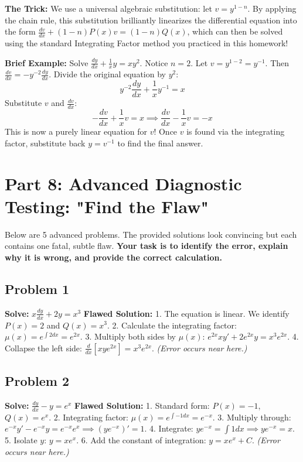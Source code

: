 \documentclass[11pt]{article}
\begin{document}
\textbf{The Trick:} We use a universal algebraic substitution: let $v = y^{1-n}$. By applying the chain rule, this substitution brilliantly linearizes the differential equation into the form $\frac{dv}{dx} + (1-n)P(x)v = (1-n)Q(x)$, which can then be solved using the standard Integrating Factor method you practiced in this homework!

\textbf{Brief Example:}
Solve $\frac{dy}{dx} + \frac{1}{x}y = xy^2$.
Notice $n = 2$.
Let $v = y^{1-2} = y^{-1}$. Then $\frac{dv}{dx} = -y^{-2} \frac{dy}{dx}$.
Divide the original equation by $y^2$:
\[ y^{-2}\frac{dy}{dx} + \frac{1}{x}y^{-1} = x \]
Substitute $v$ and $\frac{dv}{dx}$:
\[ -\frac{dv}{dx} + \frac{1}{x}v = x \implies \frac{dv}{dx} - \frac{1}{x}v = -x \]
This is now a purely linear equation for $v$! Once $v$ is found via the integrating factor, substitute back $y = v^{-1}$ to find the final answer.

\newpage
\section{Part 8: Advanced Diagnostic Testing: "Find the Flaw"}

Below are 5 advanced problems. The provided solutions look convincing but each contains one fatal, subtle flaw. \textbf{Your task is to identify the error, explain why it is wrong, and provide the correct calculation.}

\subsection*{Problem 1}
\textbf{Solve:} $x \frac{dy}{dx} + 2y = x^3$
\textbf{Flawed Solution:}
1. The equation is linear. We identify $P(x) = 2$ and $Q(x) = x^3$.
2. Calculate the integrating factor: $\mu(x) = e^{\int 2 dx} = e^{2x}$.
3. Multiply both sides by $\mu(x)$: $e^{2x} x y' + 2e^{2x} y = x^3 e^{2x}$.
4. Collapse the left side: $\frac{d}{dx} [x y e^{2x}] = x^3 e^{2x}$. 
\textit{(Error occurs near here.)}

\subsection*{Problem 2}
\textbf{Solve:} $\frac{dy}{dx} - y = e^x$
\textbf{Flawed Solution:}
1. Standard form: $P(x) = -1$, $Q(x) = e^x$.
2. Integrating factor: $\mu(x) = e^{\int -1 dx} = e^{-x}$.
3. Multiply through: $e^{-x} y' - e^{-x} y = e^{-x} e^x \implies (y e^{-x})' = 1$.
4. Integrate: $y e^{-x} = \int 1 dx \implies y e^{-x} = x$.
5. Isolate $y$: $y = x e^x$.
6. Add the constant of integration: $y = x e^x + C$.
\textit{(Error occurs near here.)}
\end{document}
